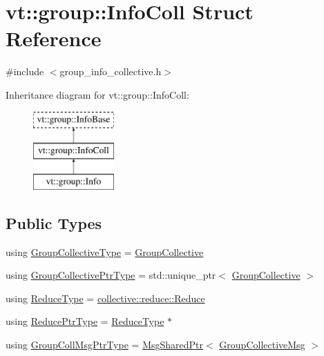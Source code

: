 \hypertarget{structvt_1_1group_1_1_info_coll}{}\section{vt\+:\+:group\+:\+:Info\+Coll Struct Reference}
\label{structvt_1_1group_1_1_info_coll}


{\ttfamily \#include $<$group\+\_\+info\+\_\+collective.\+h$>$}

Inheritance diagram for vt\+:\+:group\+:\+:Info\+Coll\+:\begin{figure}[H]
\begin{center}
\leavevmode
\includegraphics[height=3.000000cm]{structvt_1_1group_1_1_info_coll}
\end{center}
\end{figure}
\subsection*{Public Types}
\begin{DoxyCompactItemize}
\item 
using \hyperlink{structvt_1_1group_1_1_info_coll_a49957a600d853362ccc55f1ad9d1b173}{Group\+Collective\+Type} = \hyperlink{structvt_1_1group_1_1_group_collective}{Group\+Collective}
\item 
using \hyperlink{structvt_1_1group_1_1_info_coll_a96f3e779eb522034ee3db6c93b3f4c6b}{Group\+Collective\+Ptr\+Type} = std\+::unique\+\_\+ptr$<$ \hyperlink{structvt_1_1group_1_1_group_collective}{Group\+Collective} $>$
\item 
using \hyperlink{structvt_1_1group_1_1_info_coll_a8376e2576e5e40b3c8059122bc96ec1b}{Reduce\+Type} = \hyperlink{structvt_1_1collective_1_1reduce_1_1_reduce}{collective\+::reduce\+::\+Reduce}
\item 
using \hyperlink{structvt_1_1group_1_1_info_coll_a1b9fe0214f622ed9e8987531f44ef1fa}{Reduce\+Ptr\+Type} = \hyperlink{structvt_1_1group_1_1_info_coll_a8376e2576e5e40b3c8059122bc96ec1b}{Reduce\+Type} $\ast$
\item 
using \hyperlink{structvt_1_1group_1_1_info_coll_a1fcdc451e1e99aedebf302b234c529a6}{Group\+Coll\+Msg\+Ptr\+Type} = \hyperlink{namespacevt_ab2b3d506ec8e8d1540aede826d84a239}{Msg\+Shared\+Ptr}$<$ \hyperlink{namespacevt_1_1group_a4c1183efe0185992fefb3ab38a55a8a7}{Group\+Collective\+Msg} $>$
\end{DoxyCompactItemize}

